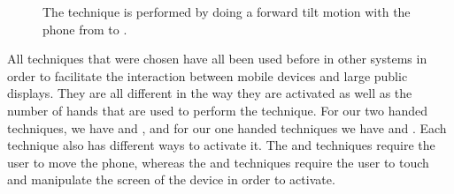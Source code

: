 \begin{figure}[H]
	\caption{The \tilt technique is performed by doing a forward tilt motion with the phone from \protect{} to \protect{}.}
	\label{fig:tiltTechnique}
\end{figure}

All techniques that were chosen have all been used before in other systems in order to facilitate the interaction between mobile devices and large public displays.
They are all different in the way they are activated as well as the number of hands that are used to perform the technique.
For our two handed techniques, we have \throw and \grab, and for our one handed techniques we have \tilt and \swipe. 
Each technique also has different ways to activate it. 
The \throw and \tilt techniques require the user to move the phone, whereas the \swipe and \grab techniques require the user to touch and manipulate the screen of the device in order to activate. 

